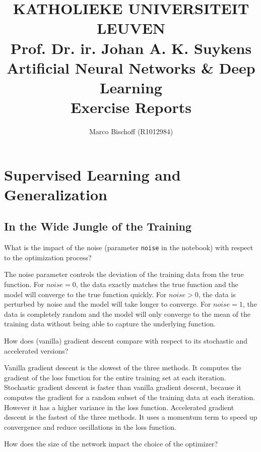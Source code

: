 \documentclass{article}
\title{
  \vspace*{2cm}
  {\bf \scriptsize
    KATHOLIEKE UNIVERSITEIT LEUVEN \\\vspace{0.3cm}
    Prof. Dr. ir. Johan A. K. Suykens
  } \vspace{2cm} \\
  Artificial Neural Networks \& Deep Learning \\
  {\large Exercise Reports}
}
\author{Marco Bischoff (R1012984)}
\newenvironment{task}[1]{
  \begin{tcolorbox}[
    colback=highlight!5!white,
    colframe=highlight,
    title={Task #1}
  ]
}{
  \end{tcolorbox}
}
\begin{document}
\pagestyle{headings}

\maketitle
\newpage

\tableofcontents
\newpage



\section{Supervised Learning and Generalization}
\label{ex:1}

\setcounter{subsection}{2}
\subsection{In the Wide Jungle of the Training}
\label{task:1.3}


\begin{task}{1.3.1}
  What is the impact of the noise (parameter \texttt{noise} in the notebook) with respect to the
  optimization process?
\end{task}

The noise parameter controls the deviation of the training data from the true function. For $noise =
  0$, the data exactly matches the true function and the model will converge to the true function
quickly. For $noise > 0$, the data is perturbed by noise and the model will take longer to converge.
For $noise = 1$, the data is completely random and the model will only converge to the mean of the
training data without being able to capture the underlying function.


\begin{task}{1.3.2}
  How does (vanilla) gradient descent compare with respect to its stochastic and accelerated
  versions?
\end{task}

Vanilla gradient descent is the slowest of the three methods. It computes the gradient of the loss
function for the entire training set at each iteration. Stochastic gradient descent is faster
than vanilla gradient descent, because it computes the gradient for a random subset of the training
data at each iteration. However it has a higher variance in the loss function. Accelerated gradient
descent is the fastest of the three methods. It uses a momentum term to speed up convergence and
reduce oscillations in the loss function.


\begin{task}{1.3.3}
  How does the size of the network impact the choice of the optimizer?
\end{task}
\end{document}
